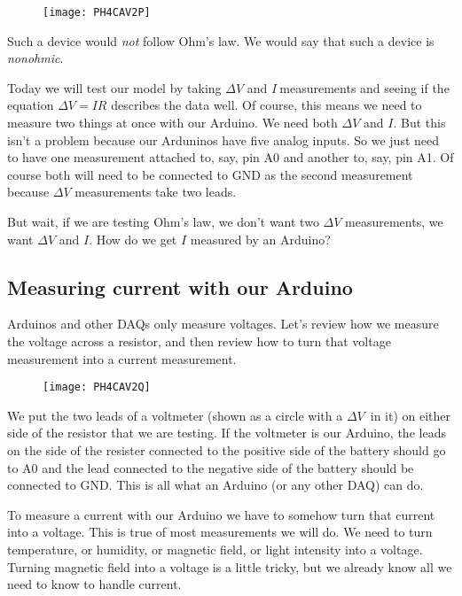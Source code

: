 \begin{figure}[h!]
	\centering
	\texttt{[image: PH4CAV2P]}
\end{figure}

\noindent Such a device would \emph{not} follow Ohm's law. We would say that such a device is \emph{nonohmic}.

Today we will test our model by taking $\Delta V$ and $I\ $measurements and seeing if the equation $\Delta V=IR$ describes the data well. Of course, this means we need to measure two things at once with our Arduino. We need both $\Delta V$ and $I.$ But this isn't a problem because our Arduninos have five analog inputs. So we just need to have one measurement attached to, say, pin A0 and another to, say, pin A1. Of course both will need to be
connected to GND as the second measurement because $\Delta V$ measurements
take two leads. 

But wait, if we are testing Ohm's law, we don't want two $\Delta V$ measurements, we want $\Delta V$ and $I.$ How do we get $I$ measured by an Arduino?

\subsection{Measuring current with our Arduino}

Arduinos and other DAQs only measure voltages. Let's review how we measure the voltage across a resistor, and then review how to turn that voltage measurement into a current measurement.

\begin{figure}[h!]
	\centering
	\texttt{[image: PH4CAV2Q]}
\end{figure}

We put the two leads of a voltmeter (shown as a circle with a $\Delta V$\ in it) on either side of the resistor that we are testing. If the voltmeter is our Arduino, the leads on the side of the resister connected to the positive side of the battery should go to A0 and the lead connected to the negative side of the battery should be connected to GND. This is all what an Arduino (or any other DAQ) can do.

To measure a current with our Arduino we have to somehow turn that current into a voltage. This is true of most measurements we will do. We need to turn temperature, or humidity, or magnetic field, or light intensity into a voltage. Turning magnetic field into a voltage is a little tricky, but we already know all we need to know to handle current.

